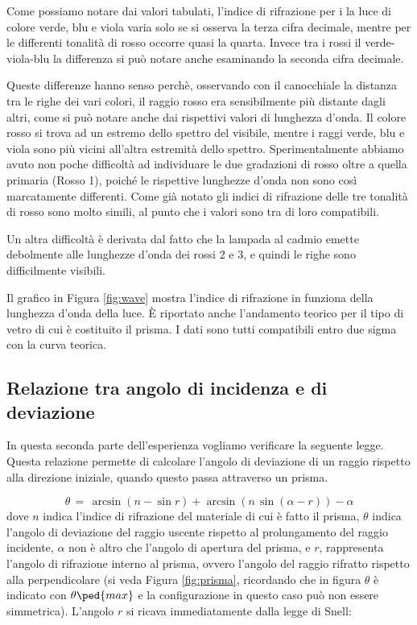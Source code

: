 Come possiamo notare dai valori tabulati, l'indice di rifrazione per i la luce di colore verde, blu e viola varia solo se si osserva la terza cifra decimale, mentre per le differenti tonalità di rosso occorre quasi la quarta. Invece tra i rossi il verde-viola-blu la differenza si può notare anche esaminando la seconda cifra decimale.

Queste differenze hanno senso perchè, osservando con il canocchiale la distanza tra le righe dei vari colori, il raggio rosso era sensibilmente più distante dagli altri, come si può notare anche dai rispettivi valori di lunghezza d'onda. Il colore rosso si trova ad un estremo dello spettro del visibile, mentre i raggi verde, blu e viola sono più vicini all'altra estremità dello spettro. Sperimentalmente abbiamo avuto non poche difficoltà ad individuare le due gradazioni di rosso oltre a quella primaria (Rosso 1), poiché le rispettive lunghezze d'onda non sono così marcatamente differenti. Come già notato gli indici di rifrazione delle tre tonalità di rosso sono molto simili, al punto che i valori sono tra di loro compatibili.

Un altra difficoltà è derivata dal fatto che la lampada al cadmio emette debolmente alle lunghezze d'onda dei rossi 2 e 3, e quindi le righe sono difficilmente visibili.

Il grafico in Figura \ref{fig:wave} mostra l'indice di rifrazione in funziona della lunghezza d'onda della luce. È riportato anche l'andamento teorico per il tipo di vetro di cui è costituito il prisma. I dati sono tutti compatibili entro due sigma con la curva teorica.

\subsection{Relazione tra angolo di incidenza e di deviazione}

In questa seconda parte dell'esperienza vogliamo verificare la seguente legge. Questa relazione permette di calcolare l'angolo di deviazione di un raggio rispetto alla direzione iniziale, quando questo passa attraverso un prisma.

\begin{equation}
	\theta \,=\, \arcsin{(n - \sin{r})} + \arcsin{(n \, \sin{(\alpha - r)})} - \alpha
	\label{eq:brutta}
\end{equation}
%
dove $n$ indica l'indice di rifrazione del materiale di cui è fatto il prisma, $\theta$ indica l'angolo di deviazione del raggio uscente rispetto al prolungamento del raggio incidente, $\alpha$ non è altro che l'angolo di apertura del prisma, e $r$, rappresenta l'angolo di rifrazione interno al prisma, ovvero l'angolo del raggio rifratto rispetto alla perpendicolare (si veda Figura \ref{fig:prisma}, ricordando che in figura $\theta$ è indicato con $\theta\ped{max}$ e la configurazione in questo caso può non essere simmetrica). L'angolo $r$ si ricava immediatamente dalla legge di Snell:

